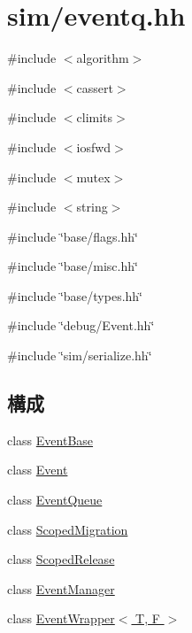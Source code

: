 \hypertarget{eventq_8hh}{
\section{sim/eventq.hh}
\label{eventq_8hh}
}
{\ttfamily \#include $<$algorithm$>$}\par
{\ttfamily \#include $<$cassert$>$}\par
{\ttfamily \#include $<$climits$>$}\par
{\ttfamily \#include $<$iosfwd$>$}\par
{\ttfamily \#include $<$mutex$>$}\par
{\ttfamily \#include $<$string$>$}\par
{\ttfamily \#include \char`\"{}base/flags.hh\char`\"{}}\par
{\ttfamily \#include \char`\"{}base/misc.hh\char`\"{}}\par
{\ttfamily \#include \char`\"{}base/types.hh\char`\"{}}\par
{\ttfamily \#include \char`\"{}debug/Event.hh\char`\"{}}\par
{\ttfamily \#include \char`\"{}sim/serialize.hh\char`\"{}}\par
\subsection*{構成}
\begin{DoxyCompactItemize}
\item 
class \hyperlink{classEventBase}{EventBase}
\item 
class \hyperlink{classEvent}{Event}
\item 
class \hyperlink{classEventQueue}{EventQueue}
\item 
class \hyperlink{classEventQueue_1_1ScopedMigration}{ScopedMigration}
\item 
class \hyperlink{classEventQueue_1_1ScopedRelease}{ScopedRelease}
\item 
class \hyperlink{classEventManager}{EventManager}
\item 
class \hyperlink{classEventWrapper}{EventWrapper$<$ T, F $>$}
\end{DoxyCompactItemize}
